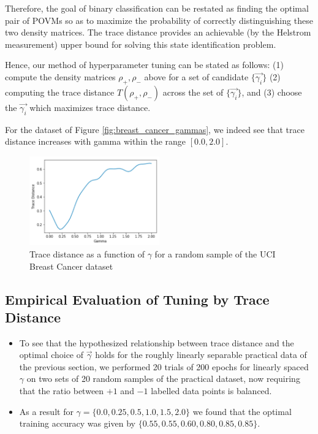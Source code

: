 \documentclass{beamer}
\newcommand\0{\mathbf{0}}
\newcommand\<{\langle}
\renewcommand\>{\rangle}
\begin{document}
\begin{frame}

Therefore, the goal of binary classification can be restated as finding the optimal pair of POVMs so as to maximize the probability of correctly distinguishing these two density matrices. The trace distance provides an achievable (by the Helstrom measurement) upper bound for solving this state identification problem. 

Hence, our method of hyperparameter tuning can be stated as follows: (1) compute the density matrices $\rho_+, \rho_-$ above for a set of candidate $\{ \vec{\gamma_i} \}$ (2) computing the trace distance $T(\rho_+, \rho_-)$ across the set of $\{ \vec{\gamma_i} \}$, and (3) choose the $\vec{\gamma_i}$ which maximizes trace distance. 

\end{frame}

\begin{frame}
For the dataset of Figure \ref{fig:breast_cancer_gammas}, we indeed see that trace distance increases with gamma within the range $[0.0, 2.0]$.
\end{frame}
\begin{frame}
\begin{figure}[H]
\centering
\includegraphics[width=0.5\textwidth]{images/linear_trace_distance}	
\caption{Trace distance as a function of $\gamma$ for a random sample of the UCI Breast Cancer dataset}
\end{figure}

\end{frame}

\subsection{Empirical Evaluation of Tuning by Trace Distance}

\begin{frame}
\begin{itemize}
\item To see that the hypothesized relationship between trace distance and the optimal choice of $\vec{\gamma}$ holds for the roughly linearly separable practical data of the previous section, we performed 20 trials of 200 epochs for linearly spaced $\gamma$ on two sets of 20 random samples of the practical dataset, now requiring that the ratio between $+1$ and $-1$ labelled data points is balanced. 
\item As a result for $\gamma = \{0.0, 0.25, 0.5, 1.0, 1.5, 2.0\}$ we found that the optimal training accuracy was given by $\{ 0.55, 0.55, 0.60, 0.80, 0.85, 0.85 \}$.
\end{itemize}
\end{frame}
\end{document}
